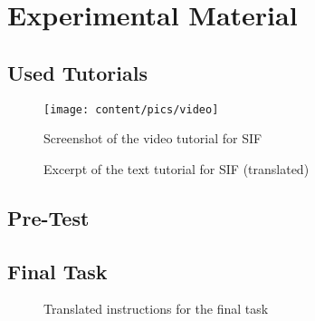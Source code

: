\section{Experimental Material}

\subsection{Used Tutorials}
\label{app:tut}

\begin{figure}[h]
	\texttt{[image: content/pics/video]}
	\caption{Screenshot of the video tutorial for SIF}
	\label{fig:video}
\end{figure}


\begin{figure}
	\caption{Excerpt of the text tutorial for SIF (translated)}
	\label{fig:leiste}
\end{figure}







\newpage
\subsection{Pre-Test}
\label{app:pretest}

\begin{center}
	\label{fig:pretest1}
\end{center}

\begin{center}
	\label{fig:pretest2}
\end{center}




\newpage
\subsection{Final Task}

\begin{figure}[h]
  \caption{Translated instructions for the final task}
  \label{fig:instr}
\end{figure}





